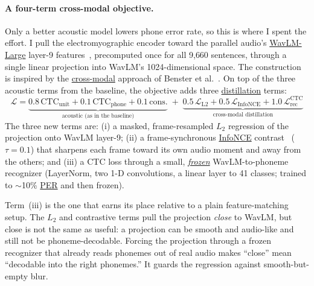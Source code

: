 \documentclass{article}
\DeclareRobustCommand{\glref}[2]{\hyperlink{gl:#1}{\textcolor{glosslink}{#2}}}
\DeclareRobustCommand{\per}{\glref{per}{PER}}
\begin{document}
\paragraph{A four-term cross-modal objective.}
Only a better acoustic model lowers phone error rate, so this is where I spent the effort. I pull the
electromyographic encoder toward the parallel audio's \glref{wavlm}{WavLM-Large} layer-9
features~\citep{chen2022wavlm}, precomputed once for all 9{,}660 sentences, through a single linear
projection into WavLM's 1024-dimensional space. The construction is inspired by the
\glref{crossmodal}{cross-modal} approach of Benster et al.~\citep{benster2024mona}. On top of the
three acoustic terms from the baseline, the objective adds three \glref{distill}{distillation} terms:
\begin{equation}
\mathcal{L}
= \underbrace{0.8\,\mathrm{CTC}_{\text{unit}} + 0.1\,\mathrm{CTC}_{\text{phone}} + 0.1\,\text{cons.}}_{\text{acoustic (as in the baseline)}}
\;+\;
\underbrace{0.5\,\mathcal{L}_{\text{L2}} + 0.5\,\mathcal{L}_{\text{InfoNCE}} + 1.0\,\mathcal{L}^{\text{CTC}}_{\text{rec}}}_{\text{cross-modal distillation}}
\end{equation}
The three new terms are: (i) a masked, frame-resampled $L_2$ regression of the projection onto WavLM
layer-9; (ii) a frame-synchronous \glref{infonce}{InfoNCE} contrast~\citep{oord2018cpc} ($\tau=0.1$)
that sharpens each frame toward its own audio moment and away from the others; and (iii) a CTC loss
through a small, \emph{\glref{frozen}{frozen}} WavLM-to-phoneme recognizer (LayerNorm, two 1-D
convolutions, a linear layer to 41 classes; trained to $\sim$10\% \per{} and then frozen).

Term~(iii) is the one that earns its place relative to a plain feature-matching setup. The $L_2$ and
contrastive terms pull the projection \emph{close} to WavLM, but close is not the same as useful: a
projection can be smooth and audio-like and still not be phoneme-decodable. Forcing the projection
through a frozen recognizer that already reads phonemes out of real audio makes ``close'' mean
``decodable into the right phonemes.'' It guards the regression against smooth-but-empty blur.
\end{document}
